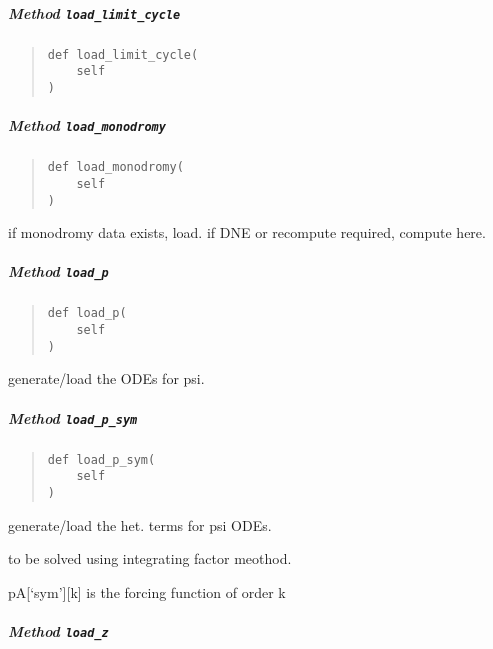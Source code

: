 \documentclass[english,a4paper,oneside]{article}
\let\oldsubparagraph\subparagraph
\renewcommand{\subparagraph}[1]{\oldsubparagraph{#1}\mbox{}}
\begin{document}
\hypertarget{StrongCoupling.StrongCoupling.load_limit_cycle}{%
\subparagraph{\texorpdfstring{Method
\texttt{load\_limit\_cycle}}{Method load\_limit\_cycle}}\label{StrongCoupling.StrongCoupling.load_limit_cycle}}

\begin{quote}
\begin{verbatim}
def load_limit_cycle(
    self
)
\end{verbatim}
\end{quote}

\hypertarget{StrongCoupling.StrongCoupling.load_monodromy}{%
\subparagraph{\texorpdfstring{Method
\texttt{load\_monodromy}}{Method load\_monodromy}}\label{StrongCoupling.StrongCoupling.load_monodromy}}

\begin{quote}
\begin{verbatim}
def load_monodromy(
    self
)
\end{verbatim}
\end{quote}

if monodromy data exists, load. if DNE or recompute required, compute
here.

\hypertarget{StrongCoupling.StrongCoupling.load_p}{%
\subparagraph{\texorpdfstring{Method
\texttt{load\_p}}{Method load\_p}}\label{StrongCoupling.StrongCoupling.load_p}}

\begin{quote}
\begin{verbatim}
def load_p(
    self
)
\end{verbatim}
\end{quote}

generate/load the ODEs for psi.

\hypertarget{StrongCoupling.StrongCoupling.load_p_sym}{%
\subparagraph{\texorpdfstring{Method
\texttt{load\_p\_sym}}{Method load\_p\_sym}}\label{StrongCoupling.StrongCoupling.load_p_sym}}

\begin{quote}
\begin{verbatim}
def load_p_sym(
    self
)
\end{verbatim}
\end{quote}

generate/load the het. terms for psi ODEs.

to be solved using integrating factor meothod.

pA{[}`sym'{]}{[}k{]} is the forcing function of order k

\hypertarget{StrongCoupling.StrongCoupling.load_z}{%
\subparagraph{\texorpdfstring{Method
\texttt{load\_z}}{Method load\_z}}\label{StrongCoupling.StrongCoupling.load_z}}
\end{document}
